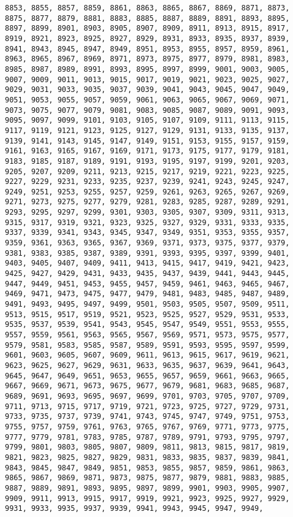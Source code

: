 \documentclass[11pt]{article}
\begin{document}
\begin{Verbatim}[commandchars=\\\{\}]
8853, 8855, 8857, 8859, 8861, 8863, 8865, 8867, 8869, 8871, 8873, 8875, 8877, 8879, 8881, 8883, 8885, 8887, 8889, 8891, 8893, 8895, 8897, 8899, 8901, 8903, 8905, 8907, 8909, 8911, 8913, 8915, 8917, 8919, 8921, 8923, 8925, 8927, 8929, 8931, 8933, 8935, 8937, 8939, 8941, 8943, 8945, 8947, 8949, 8951, 8953, 8955, 8957, 8959, 8961, 8963, 8965, 8967, 8969, 8971, 8973, 8975, 8977, 8979, 8981, 8983, 8985, 8987, 8989, 8991, 8993, 8995, 8997, 8999, 9001, 9003, 9005, 9007, 9009, 9011, 9013, 9015, 9017, 9019, 9021, 9023, 9025, 9027, 9029, 9031, 9033, 9035, 9037, 9039, 9041, 9043, 9045, 9047, 9049, 9051, 9053, 9055, 9057, 9059, 9061, 9063, 9065, 9067, 9069, 9071, 9073, 9075, 9077, 9079, 9081, 9083, 9085, 9087, 9089, 9091, 9093, 9095, 9097, 9099, 9101, 9103, 9105, 9107, 9109, 9111, 9113, 9115, 9117, 9119, 9121, 9123, 9125, 9127, 9129, 9131, 9133, 9135, 9137, 9139, 9141, 9143, 9145, 9147, 9149, 9151, 9153, 9155, 9157, 9159, 9161, 9163, 9165, 9167, 9169, 9171, 9173, 9175, 9177, 9179, 9181, 9183, 9185, 9187, 9189, 9191, 9193, 9195, 9197, 9199, 9201, 9203, 9205, 9207, 9209, 9211, 9213, 9215, 9217, 9219, 9221, 9223, 9225, 9227, 9229, 9231, 9233, 9235, 9237, 9239, 9241, 9243, 9245, 9247, 9249, 9251, 9253, 9255, 9257, 9259, 9261, 9263, 9265, 9267, 9269, 9271, 9273, 9275, 9277, 9279, 9281, 9283, 9285, 9287, 9289, 9291, 9293, 9295, 9297, 9299, 9301, 9303, 9305, 9307, 9309, 9311, 9313, 9315, 9317, 9319, 9321, 9323, 9325, 9327, 9329, 9331, 9333, 9335, 9337, 9339, 9341, 9343, 9345, 9347, 9349, 9351, 9353, 9355, 9357, 9359, 9361, 9363, 9365, 9367, 9369, 9371, 9373, 9375, 9377, 9379, 9381, 9383, 9385, 9387, 9389, 9391, 9393, 9395, 9397, 9399, 9401, 9403, 9405, 9407, 9409, 9411, 9413, 9415, 9417, 9419, 9421, 9423, 9425, 9427, 9429, 9431, 9433, 9435, 9437, 9439, 9441, 9443, 9445, 9447, 9449, 9451, 9453, 9455, 9457, 9459, 9461, 9463, 9465, 9467, 9469, 9471, 9473, 9475, 9477, 9479, 9481, 9483, 9485, 9487, 9489, 9491, 9493, 9495, 9497, 9499, 9501, 9503, 9505, 9507, 9509, 9511, 9513, 9515, 9517, 9519, 9521, 9523, 9525, 9527, 9529, 9531, 9533, 9535, 9537, 9539, 9541, 9543, 9545, 9547, 9549, 9551, 9553, 9555, 9557, 9559, 9561, 9563, 9565, 9567, 9569, 9571, 9573, 9575, 9577, 9579, 9581, 9583, 9585, 9587, 9589, 9591, 9593, 9595, 9597, 9599, 9601, 9603, 9605, 9607, 9609, 9611, 9613, 9615, 9617, 9619, 9621, 9623, 9625, 9627, 9629, 9631, 9633, 9635, 9637, 9639, 9641, 9643, 9645, 9647, 9649, 9651, 9653, 9655, 9657, 9659, 9661, 9663, 9665, 9667, 9669, 9671, 9673, 9675, 9677, 9679, 9681, 9683, 9685, 9687, 9689, 9691, 9693, 9695, 9697, 9699, 9701, 9703, 9705, 9707, 9709, 9711, 9713, 9715, 9717, 9719, 9721, 9723, 9725, 9727, 9729, 9731, 9733, 9735, 9737, 9739, 9741, 9743, 9745, 9747, 9749, 9751, 9753, 9755, 9757, 9759, 9761, 9763, 9765, 9767, 9769, 9771, 9773, 9775, 9777, 9779, 9781, 9783, 9785, 9787, 9789, 9791, 9793, 9795, 9797, 9799, 9801, 9803, 9805, 9807, 9809, 9811, 9813, 9815, 9817, 9819, 9821, 9823, 9825, 9827, 9829, 9831, 9833, 9835, 9837, 9839, 9841, 9843, 9845, 9847, 9849, 9851, 9853, 9855, 9857, 9859, 9861, 9863, 9865, 9867, 9869, 9871, 9873, 9875, 9877, 9879, 9881, 9883, 9885, 9887, 9889, 9891, 9893, 9895, 9897, 9899, 9901, 9903, 9905, 9907, 9909, 9911, 9913, 9915, 9917, 9919, 9921, 9923, 9925, 9927, 9929, 9931, 9933, 9935, 9937, 9939, 9941, 9943, 9945, 9947, 9949, 
\end{Verbatim}
\end{document}
